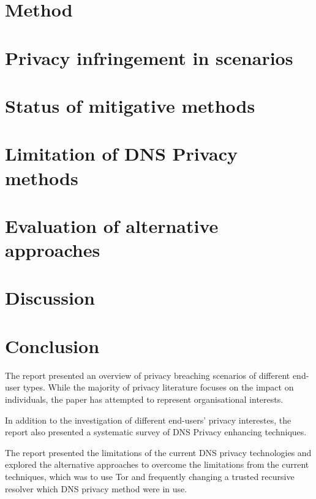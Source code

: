 \documentclass[a4paper,12pt]{article}
\begin{document}
\newpage
\section{Method}\label{Method}


\newpage
\section{Privacy infringement in scenarios}


\newpage
\section{Status of mitigative methods}\label{surveyresults}


\newpage
\section{Limitation of DNS Privacy methods}


\newpage
\section{Evaluation of alternative approaches}

\newpage

\section{Discussion}

\newpage

\section{Conclusion}
The report presented an overview of privacy breaching scenarios of different end-user types.
While the majority of privacy literature focuses on the impact on individuals, the paper has attempted to represent organisational interests.

In addition to the investigation of different end-users' privacy interestes, the report also presented a systematic survey of DNS Privacy enhancing techniques.

The report presented the limitations of the current DNS privacy technologies and explored the alternative approaches to overcome the limitations from the current techniques, which was to use Tor and frequently changing a trusted recursive resolver which DNS privacy method were in use.
\end{document}
